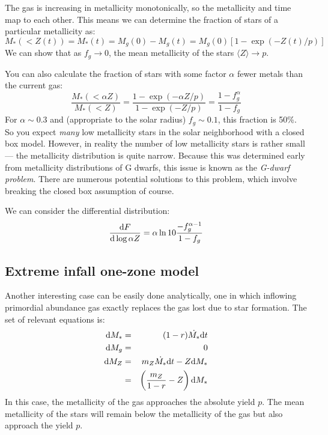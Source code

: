 The gas is increasing in metallicity monotonically, so the metallicity
and time map to each other.  This means we can determine the fraction
of stars of a particular metallicity as:
\begin{equation}
M_\ast(<Z(t)) = M_\ast(t) = M_g(0) - M_g(t) = M_g(0)
\left[1-\exp\left(-Z(t)/p\right)\right]
\end{equation}
We can show that as $f_g \rightarrow 0$, the mean metallicity of the
stars $\langle Z\rangle\rightarrow p$.

You can also calculate the fraction of stars with some
factor $\alpha$ fewer metals than the current gas:  
\begin{equation}
  \frac{M_\ast(<\alpha Z)}{M_\ast(< Z)}=
  \frac{1- \exp(-\alpha Z/p)} {1- \exp(-Z/p)} =
  \frac{1-f_g^{\alpha}}{1-f_g}
\end{equation}
For $\alpha \sim 0.3$ and (appropriate to the solar radius) $f_g \sim
0.1$, this fraction is 50\%. So you expect {\it many} low metallicity
stars in the solar neighborhood with a closed box model. However, in
reality the number of low metallicity stars is rather small --- the
metallicity distribution is quite narrow. Because this was determined
early from metallicity distributions of G dwarfs, this issue is known
as the {\it G-dwarf problem}.  There are numerous potential solutions
to this problem, which involve breaking the closed box assumption of
course.

We can consider the differential distribution:
\begin{equation}
\frac{{\rm d}F}{{\rm d}\log\alpha Z} = \alpha \ln 10 \frac{-
 f_g^{\alpha -1 }}{1-f_g}
\end{equation}

\subsection{Extreme infall one-zone model}

Another interesting case can be easily done analytically, one in which
inflowing primordial abundance gas exactly replaces the gas lost due
to star formation. The set of relevant equations is:
\begin{eqnarray}
{\rm d}M_\ast &=& (1-r) \dot{M_\ast} {\rm d}t \cr
{\rm d}M_g &=& 0 \cr
{\rm d}M_Z &=& m_Z \dot{M_\ast} {\rm d}t - Z {\rm d}M_\ast \cr
&=& \left(\frac{m_Z}{1-r} - Z\right) {\rm d}M_\ast
\end{eqnarray}
In this case, the metallicity of the gas  approaches the absolute
yield $p$. The mean metallicity of the stars will remain below the
metallicity of the gas but also approach the yield $p$.      

